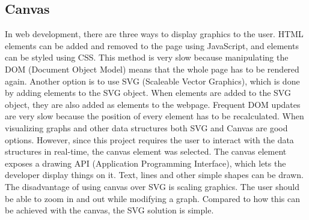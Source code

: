 \subsection{Canvas}
In web development, there are three ways to display graphics to the user. HTML elements can be added and removed to the page using JavaScript, and elements can be styled using CSS. This method is very slow because manipulating the DOM (Document Object Model) means that the whole page has to be rendered again. Another option is to use SVG (Scaleable Vector Graphics)\cite{SVG:Info}, which is done by adding elements to the SVG object. When elements are added to the SVG object, they are also added as elements to the webpage. Frequent DOM updates are very slow because the position of every element has to be recalculated. When visualizing graphs and other data structures both SVG and Canvas\cite{Canvas:Info} are good options. However, since this project requires the user to interact with the data structures in real-time, the canvas element was selected. The canvas element exposes a drawing API (Application Programming Interface), which lets the developer display things on it. Text, lines and other simple shapes can be drawn. The disadvantage of using canvas over SVG is scaling graphics. The user should be able to zoom in and out while modifying a graph. Compared to how this can be achieved with the canvas, the SVG solution is simple.